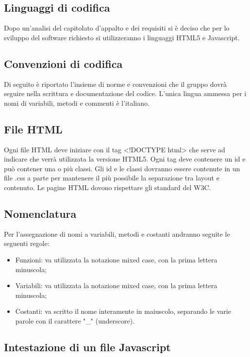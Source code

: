 \subsection{Linguaggi di codifica}
Dopo un'analisi del capitolato d'appalto e dei requisiti si è deciso che per lo sviluppo del software richiesto si utilizzeranno i linguaggi \gls{HTML5} e \gls{Javascript}.

\subsection{Convenzioni di codifica}
Di seguito è riportato l'insieme di norme e convenzioni che il gruppo dovrà seguire nella scrittura e documentazione del codice.
L'unica lingua ammessa per i nomi di variabili, metodi e commenti è l'italiano.

\subsection{File HTML}

Ogni file HTML deve iniziare con il tag <!DOCTYPE html> che serve ad indicare che verrà utilizzata la versione \gls{HTML5}.
Ogni tag deve contenere un id e può contener una o più classi.
Gli id e le classi dovranno essere contenute in un file .\gls{css} a parte per mantenere il più possibile la separazione tra \gls{layout} e contenuto.
Le pagine HTML dovono rispettare gli standard del W3C.

\subsection{Nomenclatura}
Per l'assegnazione di nomi a variabili, metodi e costanti andranno seguite le seguenti regole:
\begin{itemize}
	\item Funzioni: va utilizzata la notazione mixed case, con la prima lettera minuscola;
	\item Variabili: va utilizzata la notazione mixed case, con la prima lettera minuscola;
	\item Costanti: va scritto il nome interamente in maiuscolo, separando le varie parole con il carattere "\_" (underscore).
\end{itemize}

\subsection{Intestazione di un file \gls{Javascript}}


